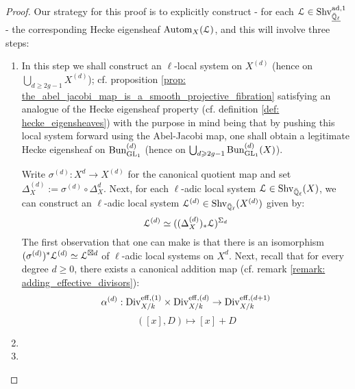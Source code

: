             \begin{proof}
                Our strategy for this proof is to explicitly construct - for each $\mathcal{L} \in \mathrm{Shv}_{\underline{\bar{\mathbb{Q}}_{\ell}}}^{\mathrm{ad}, 1}$ - the corresponding Hecke eigensheaf $\mathrm{Autom}_X(\mathcal{L})$, and this will involve three steps:
                    \begin{enumerate}
                        \item In this step we shall construct an $\ell$-local system on $X^{(d)}$ (hence on $\bigcup_{d \geq 2g - 1} X^{(d)}$); cf. proposition \ref{prop: the_abel_jacobi_map_is_a_smooth_projective_fibration} satisfying an analogue of the Hecke eigensheaf property (cf. definition \ref{def: hecke_eigensheaves}) with the purpose in mind being that by pushing this local system forward using the Abel-Jacobi map, one shall obtain a legitimate Hecke eigensheaf on $\mathrm{Bun}_{\operatorname{GL}_1}^{(d)}$ (hence on $\bigcup_{d \geqslant 2g - 1} \mathrm{Bun}_{\operatorname{GL}_1}^{(d)}(X)$).
                        
                        Write $\sigma^{(d)}: X^d \to X^{(d)}$ for the canonical quotient map and set $\Delta_X^{(d)} := \sigma^{(d)} \circ \Delta_X^d$. Next, for each $\ell$-adic local system $\mathcal{L} \in \mathrm{Shv}_{\bar{\mathbb{Q}}_{\ell}}(X)$, we can construct an $\ell$-adic local system $\mathcal{L}^{(d)} \in \mathrm{Shv}_{\bar{\mathbb{Q}}_{\ell}}(X^{(d)})$ given by:
                            $$\mathcal{L}^{(d)} \simeq ((\Delta_X^{(d)})_*\mathcal{L})^{\Sigma_d}$$
                        The first observation that one can make is that there is an isomorphism $(\sigma^{(d)})^*\mathcal{L}^{(d)} \simeq \mathcal{L}^{\boxtimes d}$ of $\ell$-adic local systems on $X^d$. Next, recall that for every degree $d \geq 0$, there exists a canonical addition map (cf. remark \ref{remark: adding_effective_divisors}):
                            $$\alpha^{(d)}: \Div_{X/k}^{\eff, (1)} \x \Div_{X/k}^{\eff, (d)} \to \Div_{X/k}^{\eff, (d + 1)}$$
                            $$([x], D) \mapsto [x] + D$$
                        
                        \item 
                        \item 
                    \end{enumerate}
            \end{proof}
